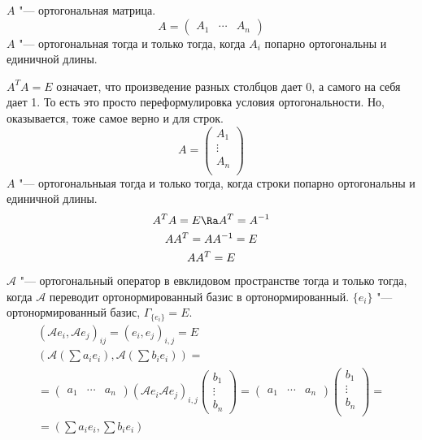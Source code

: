 \begin{conseq}
	$A$ "--- ортогональная матрица.
	\[ A = \begin{pmatrix} A_1 & \cdots & A_n\end{pmatrix} \]
	$A$ "--- ортогональная тогда и только тогда, когда $A_i$ попарно ортогональны и единичной длины.

	$A^T A = E$ означает, что произведение разных столбцов дает 0, а самого на себя дает 1.
	То есть это просто переформулировка условия ортогональности.
	Но, оказывается, тоже самое верно и для строк.
	\[ A = \begin{pmatrix} A_1 \\ \vdots \\ A_n \\ \end{pmatrix} \]
	$A$ "--- ортогональныая тогда и только тогда, когда строки попарно ортогональны и единичной длины.
	\begin{gather*}
		A^T A = E \Ra A^T  = A^{-1} \\
		A A^T  = A A^{-1} = E \\
		A A^T = E
	\end{gather*}
	$\mathcal A$ "--- ортогональный оператор в евклидовом пространстве тогда и только тогда,
	когда $\mathcal A$ переводит ортонормированный базис в ортонормированный.
	$\{e_i\}$ "--- ортонормированный базис, $\Gamma_{\{e_i\}} = E$.
	\begin{gather*}
		(\mathcal A e_i, \mathcal A e_j)_{ij} = (e_i,e_j)_{i, j} = E \\
		\left(\mathcal A \left(\sum a_i e_i\right), \mathcal A \left(\sum b_i e_i\right)\right) = \\
		=
			\begin{pmatrix} a_1 & \cdots & a_n \end{pmatrix}
			(\mathcal A e_i \mathcal A e_j)_{i, j}
			\begin{pmatrix} b_1 \\ \vdots \\ b_n \end{pmatrix}
		=
			\begin{pmatrix} a_1 & \cdots & a_n \end{pmatrix}
			\begin{pmatrix} b_1 \\ \vdots \\ b_n \\ \end{pmatrix} = \\
		= \left(\sum a_i e_i, \sum b_i e_i \right)
	\end{gather*}
\end{conseq}

